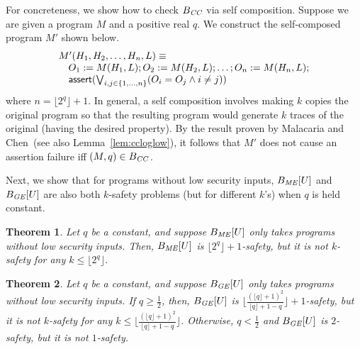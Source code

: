 \documentclass{llncs}
\newtheorem{theorem}{Theorem}[section]
\newcommand{\aset}[1]{\{{#1}\}}
\begin{document}
For concreteness, we show how to check $B_{\it CC}$ via self
composition.  Suppose we are given a program $M$ and a positive real
$q$.  We construct the self-composed program $M'$ shown below.
\[
\begin{array}{l}
  M'(H_1,H_2,\dots,H_n,L)\equiv\\
  \quad O_1:=M(H_1,L);O_2:=M(H_2,L);\dots;O_n:=M(H_n,L);\\
  \quad {\sf assert}(\bigvee_{i,j\in\aset{1,\dots,n}}(O_i=O_j\wedge i\not=j))
\end{array}
\]
where $n=\lfloor 2^q\rfloor +1$.  In general, a self composition
involves making $k$ copies the original program so that the resulting
program would generate $k$ traces of the original (having the desired
property).  By the result proven by Malacaria and
Chen~\cite{malacaria08}(see also Lemma~\ref{lem:ccloglow}), it follows
that $M'$ does not cause an assertion failure iff $(M,q)\in B_{\it
  CC}$.

Next, we show that for programs without low security inputs, $B_{\it
ME}[U]$ and $B_{\it GE}[U]$ are also both $k$-safety problems (but for
different $k$'s) when $q$ is held constant.
\begin{theorem}
\label{thm:mek}
Let $q$ be a constant, and suppose $B_{\it ME}[U]$ only takes programs
  without low security inputs.  Then, $B_{\it ME}[U]$ is $\lfloor
  2^q\rfloor +1$-safety, but it is not $k$-safety for any $k \leq
  \lfloor2^q\rfloor$.
\end{theorem}
\begin{theorem}
\label{thm:gek}
Let $q$ be a constant, and suppose $B_{\it GE}[U]$ only takes programs
without low security inputs.  If $q\ge\frac{1}{2}$, then, $B_{\it
  GE}[U]$ is $\lfloor\frac{(\lfloor q\rfloor +1)^2}{\lfloor q\rfloor
  +1 -q} \rfloor +1$-safety, but it is not $k$-safety for any $k \leq
\lfloor\frac{(\lfloor q\rfloor +1)^2}{\lfloor q\rfloor +1 -q}
\rfloor$.  Otherwise, $q<\frac{1}{2}$ and $B_{\it GE}[U]$ is
$2$-safety, but it is not $1$-safety.
\end{theorem}
\end{document}
